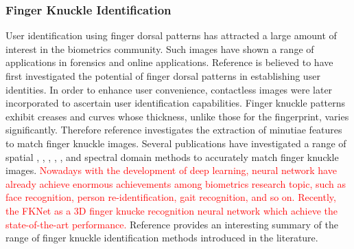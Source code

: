 \subsubsection{Finger Knuckle Identification\label{relate-work-fk}} 
User identification using finger dorsal patterns has attracted a large amount of interest in the biometrics community. Such images have shown a range of applications in forensics and online applications. Reference \cite{joshi1998computer} is believed to have first investigated the potential of finger dorsal patterns in establishing user identities. In order to enhance user convenience, contactless images were later incorporated to ascertain user identification capabilities. Finger knuckle patterns exhibit creases and curves whose thickness, unlike those for the fingerprint, varies significantly. Therefore reference \cite{kumar2015recovering} investigates the extraction of minutiae features to match finger knuckle images. Several publications have investigated a range of spatial \cite{woodard2005finger}, \cite{sricharan2006knuckle}, \cite{kumar2009personal}, \cite{zhang2010online}, \cite{zhu2010multimodal}, and spectral domain \cite{aoyama2011finger} methods to accurately match finger knuckle images. 
\textcolor{red}{Nowadays with the development of deep learning, neural network have already achieve enormous achievements among biometrics research topic, such as face recognition, person re-identification, gait recognition, and so on. Recently, the FKNet \cite{cheng2020deep} as a 3D finger knucke recognition neural network which achieve the state-of-the-art performance.} Reference \cite{jaswal2016knuckle} provides an interesting summary of the range of finger knuckle identification methods introduced in the literature. 


